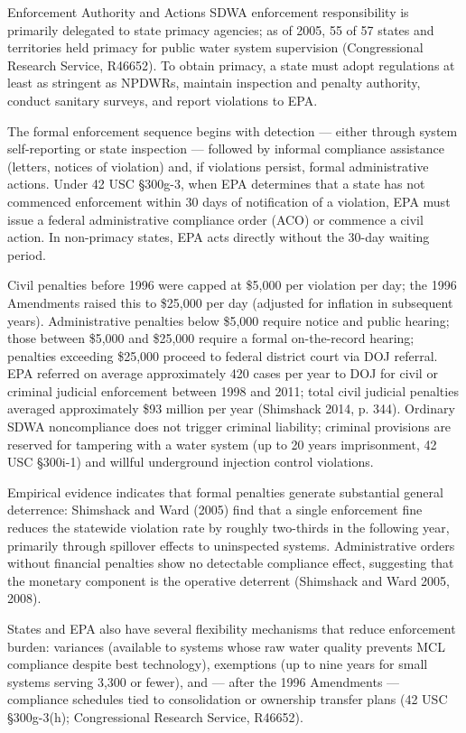 Enforcement Authority and Actions
SDWA enforcement responsibility is primarily delegated to state primacy agencies; as of 2005, 55 of 57 states and territories held primacy for public water system supervision (Congressional Research Service, R46652). To obtain primacy, a state must adopt regulations at least as stringent as NPDWRs, maintain inspection and penalty authority, conduct sanitary surveys, and report violations to EPA.

The formal enforcement sequence begins with detection — either through system self-reporting or state inspection — followed by informal compliance assistance (letters, notices of violation) and, if violations persist, formal administrative actions. Under 42 USC §300g-3, when EPA determines that a state has not commenced enforcement within 30 days of notification of a violation, EPA must issue a federal administrative compliance order (ACO) or commence a civil action. In non-primacy states, EPA acts directly without the 30-day waiting period.

Civil penalties before 1996 were capped at \$5,000 per violation per day; the 1996 Amendments raised this to \$25,000 per day (adjusted for inflation in subsequent years). Administrative penalties below \$5,000 require notice and public hearing; those between \$5,000 and \$25,000 require a formal on-the-record hearing; penalties exceeding \$25,000 proceed to federal district court via DOJ referral. EPA referred on average approximately 420 cases per year to DOJ for civil or criminal judicial enforcement between 1998 and 2011; total civil judicial penalties averaged approximately \$93 million per year (Shimshack 2014, p. 344). Ordinary SDWA noncompliance does not trigger criminal liability; criminal provisions are reserved for tampering with a water system (up to 20 years imprisonment, 42 USC §300i-1) and willful underground injection control violations.

Empirical evidence indicates that formal penalties generate substantial general deterrence: Shimshack and Ward (2005) find that a single enforcement fine reduces the statewide violation rate by roughly two-thirds in the following year, primarily through spillover effects to uninspected systems. Administrative orders without financial penalties show no detectable compliance effect, suggesting that the monetary component is the operative deterrent (Shimshack and Ward 2005, 2008).

States and EPA also have several flexibility mechanisms that reduce enforcement burden: variances (available to systems whose raw water quality prevents MCL compliance despite best technology), exemptions (up to nine years for small systems serving 3,300 or fewer), and — after the 1996 Amendments — compliance schedules tied to consolidation or ownership transfer plans (42 USC §300g-3(h); Congressional Research Service, R46652).

